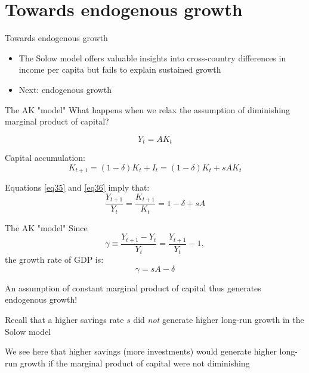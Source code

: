 \documentclass[10pt,handout]{beamer}
\begin{document}
\section{Towards endogenous growth}


\begin{frame}{Towards endogenous growth}
\begin{itemize}
    \item The Solow model offers valuable insights into cross-country differences in income per capita but fails to explain sustained growth\medskip
    \item Next: endogenous growth
\end{itemize}
\end{frame}


\begin{frame}{The AK "model"}
    What happens when we relax the assumption of diminishing marginal product of capital? \smallskip

    \begin{equation}\label{eq35}
        Y_t=AK_t
    \end{equation}\smallskip

    Capital accumulation:
    \begin{equation}\label{eq36}
        K_{t+1} = (1-\delta)K_t + I_t = (1-\delta) K_t + s AK_t
    \end{equation}\smallskip

    Equations \eqref{eq35} and \eqref{eq36} imply that:
    \begin{equation}\label{eq37}
         \frac{Y_{t+1}}{Y_{t}}=\frac{K_{t+1}}{K_{t}}= 1 - \delta + sA
    \end{equation}
\end{frame}


\begin{frame}{The AK "model"}
    Since
    \begin{equation*}
        \gamma \equiv \frac{Y_{t+1}-Y_t}{Y_{t}}= \frac{Y_{t+1}}{Y_{t}}-1,
    \end{equation*}
    the growth rate of GDP is:
    \begin{equation}\label{eq38}
        \gamma = sA - \delta
    \end{equation}

    An assumption of constant marginal product of capital thus generates endogenous growth! \medskip

    Recall that a higher savings rate $s$ did \emph{not} generate higher long-run growth in the Solow model\medskip

    We see here that higher savings (more investments) would generate higher long-run growth if the marginal product of capital were not diminishing
\end{frame}
\end{document}

